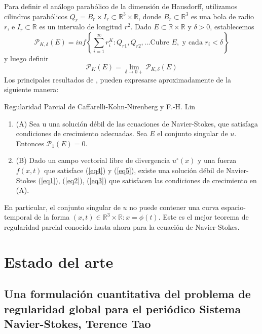 Para definir el análogo parabólico de la dimensión de Hausdorff, utilizamos cilindros parabólicos $Q_r = B_r \times I_r \subset \mathbb{R}^3 \times \mathbb{R}$, donde $B_r \subset \mathbb{R}^3$ es una bola de radio $r$, e $I_r \subset \mathbb{R}$ es un intervalo de longitud $r^2$. Dado $E \subset \mathbb{R} \times \mathbb{R}$ y $\delta  > 0$, establecemos
\begin{equation*}
    \mathcal{P}_{K,\delta}(E) = inf \left\{ \sum_{i = 1}^{\infty} r_{i}^{K}:Q_{r1},Q_{r2},\dots\text{Cubre }E, \text{ y cada }r_i<\delta \right\} 
\end{equation*}
y luego definir
\begin{equation*}
    \mathcal{P}_K(E) = \lim_{\delta \to 0+} \mathcal{P}_{K,\delta}(E)
\end{equation*}
Los principales resultados de \cite{caffarelli1982partial}, \cite{lin1998new} pueden expresarse aproximadamente de la siguiente manera:
\begin{theorem}
    Regularidad Parcial de Caffarelli-Kohn-Nirenberg y F.-H. Lin
    \begin{enumerate}
        \item (A) Sea u una solución débil de las ecuaciones de Navier-Stokes, que satisfaga condiciones de crecimiento adecuadas. Sea $E$ el conjunto singular de $u$. Entonces $\mathcal{P}_1(E)=0$.
        \item (B) Dado un campo vectorial libre de divergencia $u^{\circ}(x)$ y una fuerza $f(x, t)$ que satisface (\ref{eq4}) y (\ref{eq5}), existe una solución débil de Navier-Stokes (\ref{eq1}), (\ref{eq2}), (\ref{eq3}) que satisfacen las condiciones de crecimiento en (A).
    \end{enumerate}
\end{theorem}
En particular, el conjunto singular de $u$ no puede contener una curva espacio-temporal de la forma ${(x, t) \in \mathbb{R}^3 \times \mathbb{R}: x = \phi (t)}$. Este es el mejor teorema de regularidad parcial conocido hasta ahora para la ecuación de Navier-Stokes.

\section{Estado del arte}
\subsection{Una formulación cuantitativa del problema de regularidad global para el periódico Sistema Navier-Stokes, Terence Tao}



















